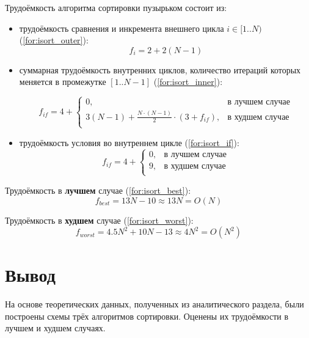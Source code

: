 Трудоёмкость алгоритма сортировки пузырьком состоит из:
\begin{itemize}
	\item трудоёмкость сравнения и инкремента внешнего цикла $i \in [1..N)$ (\ref{for:isort_outer}):
	\begin{equation}
	\label{for:isort_outer}
	f_{i} = 2 + 2(N - 1)
	\end{equation}
	\item суммарная трудоёмкость внутренних циклов, количество итераций которых меняется в промежутке $[1..N-1]$ (\ref{for:isort_inner}):

	\begin{equation}
	\label{for:isort_inner}
	f_{if} = 4 + \begin{cases}
		0, & \text{в лучшем случае}\\
		3(N - 1) + \frac{N \cdot (N - 1)}{2} \cdot (3 + f_{if}), & \text{в худшем случае}\\
	\end{cases}
	\end{equation}

	\item трудоёмкость условия во внутреннем цикле (\ref{for:isort_if}):
	\begin{equation}
	\label{for:isort_if}
	f_{if} = 4 + \begin{cases}
	0, & \text{в лучшем случае}\\
	9, & \text{в худшем случае}\\
	\end{cases}
	\end{equation}
\end{itemize}

Трудоёмкость в \textbf{лучшем} случае (\ref{for:isort_best}):
\begin{equation}
\label{for:isort_best}
f_{best} = 13N - 10 \approx 13N = O(N)
\end{equation}

Трудоёмкость в \textbf{худшем} случае (\ref{for:isort_worst}):
\begin{equation}
\label{for:isort_worst}
f_{worst} = 4.5N^2 + 10N - 13 \approx 4N^2 = O(N^{2})
\end{equation}

\clearpage
\section{Вывод}

На основе теоретических данных, полученных из аналитического раздела, были построены схемы трёх алгоритмов сортировки. Оценены их трудоёмкости в лучшем и худшем случаях.

